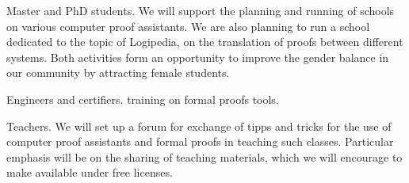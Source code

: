 \begin{workpackage}[id=dissemination,type=MGT,
  short={Dissemination},
  title={Dissemination, communication and exploitation},
  lead=Inr,InrRM=12,BirRM=4,IrtRM=4,ImtRM=2,StrRM=2,ZibRM=14,EduRM=12]
\begin{tasklist}
\begin{task}[id=training,
      title=Training Logipedia developers and users,
      lead=Bir,BirRM=2,IrtRM=2,wphases=7-42!.05]
    \begin{compactitem}
    \item Master and PhD students.
      We will support the planning and running of schools
      on various computer proof assistants.
      We are also planning to run a school dedicated to the topic of Logipedia, on the translation of proofs between different systems.
      Both activities form an
      opportunity to improve the gender balance in our community by
      attracting female students.
    \item Engineers and certifiers. training on formal proofs tools.
    \item Teachers.
       We will set up a forum for exchange of tipps and tricks for the use of computer proof assistants and formal proofs in teaching such classes.
       Particular emphasis will be on the sharing of teaching materials, which we will encourage to make available under free licenses.
    \end{compactitem}


  \end{task}


\end{tasklist}
\end{workpackage}
